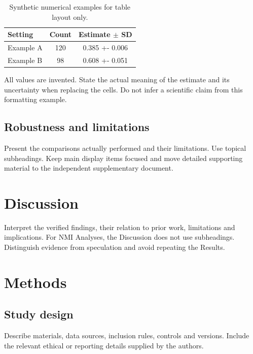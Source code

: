\documentclass[11pt]{article}
\begin{document}
\begin{table}[htbp]
\centering
\caption{Synthetic numerical examples for table layout only.}
\label{tab:comparison}
\small
\begin{tabularx}{\linewidth}{@{}>{\raggedright\arraybackslash}X
  S[table-format=3.0] S[table-format=1.3(3)]@{}}
\toprule
Setting & {Count} & {Estimate $\pm$ SD}\\
\midrule
Example A & 120 & 0.385 +- 0.006\\
Example B & 98 & 0.608 +- 0.051\\
\bottomrule
\end{tabularx}
\par\smallskip\footnotesize\raggedright
All values are invented. State the actual meaning of the estimate and its
uncertainty when replacing the cells. Do not infer a scientific claim from
this formatting example.
\end{table}

\subsection{Robustness and limitations}
Present the comparisons actually performed and their limitations. Use topical subheadings. Keep main display items focused and
move detailed supporting material to the independent supplementary document.

\section{Discussion}\label{sec:discussion}
Interpret the verified findings, their relation to prior work, limitations
and implications. For NMI Analyses, the Discussion does not use subheadings.
Distinguish evidence from speculation and avoid repeating the Results.

\section{Methods}\label{sec:methods}
\subsection{Study design}
Describe materials, data sources, inclusion rules, controls and versions.
Include the relevant ethical or reporting details supplied by the authors.
\end{document}
